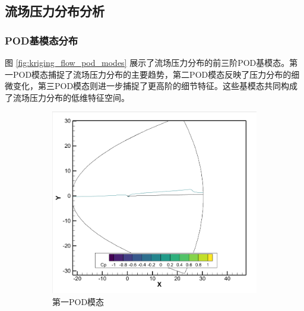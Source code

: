 \subsection{流场压力分布分析}

\subsubsection{POD基模态分布}

图 \ref{fig:kriging_flow_pod_modes} 展示了流场压力分布的前三阶POD基模态。第一POD模态捕捉了流场压力分布的主要趋势，第二POD模态反映了压力分布的细微变化，第三POD模态则进一步捕捉了更高阶的细节特征。这些基模态共同构成了流场压力分布的低维特征空间。

\begin{figure}[H]
    \centering
    \begin{subfigure}[b]{0.32\textwidth}
        \includegraphics[width=\textwidth]{image/基压力分布图/多变量流场压力基1.png}
        \caption{第一POD模态}
    \end{subfigure}
    \begin{subfigure}[b]{0.32\textwidth}

\end{subfigure}
\end{figure}
